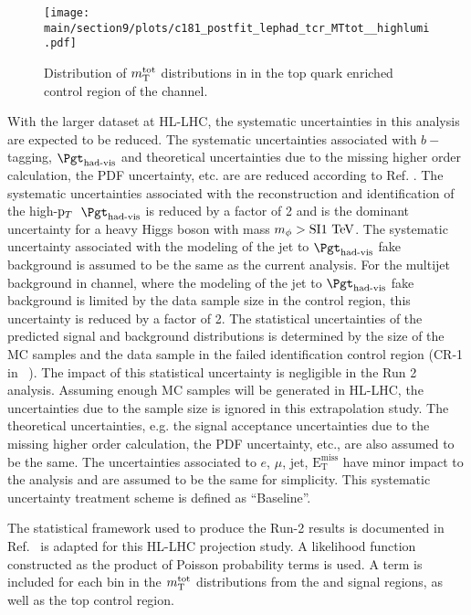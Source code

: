 \begin{figure}[!ht]
    \centering
        \qquad
        \texttt{[image: \\main/section9/plots/c181\_postfit\_lephad\_tcr\_MTtot\_\_highlumi.pdf]}
        \caption{Distribution of $m_\textnormal{T}^\textnormal{tot}$ distributions in in the top quark enriched control region of the \lephad channel.}
    \label{fig:mTtotDistributionsCR}
\end{figure}

With the larger dataset at HL-LHC, the systematic uncertainties in this analysis are expected to be reduced.
The systematic uncertainties associated with $b-$tagging, $\tauhadvis$ and theoretical uncertainties due to 
the missing higher order calculation, the PDF uncertainty, etc. are are reduced according to 
Ref. \cite{LHATLASdetectorSystScale}. The systematic uncertainties associated with the reconstruction 
and identification of the high-$\mathrm{p}_{T}$~$\tauhadvis$ is reduced by a factor of 2 and is the dominant 
uncertainty for a heavy Higgs boson with mass $m_{\phi} >\mathrm{SI}{1}{~\text{TeV}}$. The systematic uncertainty associated 
with the modeling of the jet to $\tauhadvis$ fake background is assumed to be the same as the current analysis.
For the multijet background in \hadhad channel, where the modeling of the jet to $\tauhadvis$ fake background 
is limited by the data sample size in the control region, this uncertainty is reduced by a factor of 2. 
The statistical uncertainties of the predicted signal and background distributions is determined 
by the size of the MC samples and the data sample in the failed \tauhadvis identification control region 
(CR-1 in ~\cite{ATLASRun2Ditau}). The impact of this statistical uncertainty is negligible in the Run 2 analysis. 
Assuming enough MC samples will be generated in HL-LHC, the uncertainties due to 
the sample size is ignored in this extrapolation study. The theoretical uncertainties, e.g. the signal acceptance 
uncertainties due to the missing higher order calculation, the PDF uncertainty, etc., are also assumed to be 
the same. The uncertainties associated to $e$, $\mu$, jet, $\mathrm{E^{miss}_T}$ have minor impact to the analysis 
and are assumed to be the same for simplicity. This systematic uncertainty treatment scheme is defined as ``Baseline''. 

The statistical framework used to produce the Run-2 results is documented in Ref.~\cite{ATLASRun2Ditau} is adapted 
for this HL-LHC projection study. A likelihood function constructed as the product of Poisson probability terms 
is used. A term is included for each bin in the $m_\textnormal{T}^\textnormal{tot}$ distributions from the \lephad and \hadhad signal regions, 
as well as the top control region. 

